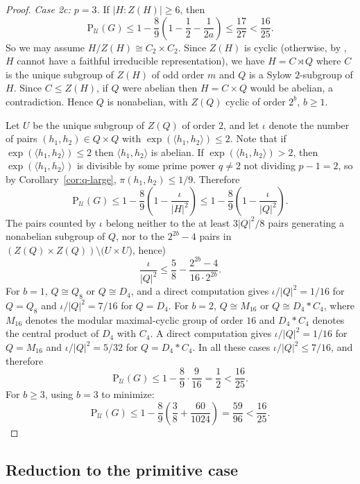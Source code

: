 \documentclass{amsart}
\newcommand{\Psu}{\mathrm{P}_{\mathcal{U}}}
\begin{document}
\begin{proof}
		\medskip
\noindent\textit{Case 2c: $p = 3$.}
If $|H:Z(H)| \geq 6$, then
$$\Psu(G) \leq 1-\frac{8}{9}\left(1-\frac{1}{2}
-\frac{1}{2a}\right) \leq \frac{17}{27} < \frac{16}{25}.$$
So we may assume $H/Z(H) \cong C_2 \times C_2$. Since $Z(H)$ 
is cyclic (otherwise, by \cite[Proposition 16.8]{dh}, $H$ cannot 
have a faithful irreducible representation), we have 
$H = C \rtimes Q$ where $C$ is the unique subgroup of $Z(H)$ 
of odd order $m$ and $Q$ is a Sylow $2$-subgroup of $H$. 
Since $C \leq Z(H)$, if $Q$ were abelian then $H = C \times Q$ 
would be abelian, a contradiction. Hence $Q$ is nonabelian, 
with $Z(Q)$ cyclic of order $2^b$, $b \geq 1$.



Let $U$ be the unique subgroup of $Z(Q)$ of order $2$, and let $\iota$ denote the number of pairs 
$(h_1,h_2) \in Q \times Q$ with $\exp(\langle h_1,h_2\rangle) 
\leq 2$. Note that if $\exp(\langle h_1,h_2\rangle) \leq 2$ 
then $\langle h_1,h_2\rangle$ is abelian. If 
$\exp(\langle h_1,h_2\rangle) > 2$, then $\exp(\langle h_1,h_2\rangle)$ 
is divisible by some prime power $q \neq 2$ not dividing 
$p-1=2$, so by Corollary~\ref{cor:q-large}, 
$\pi(h_1,h_2)\leq 1/9$. Therefore
$$\Psu(G) \leq 1 - \frac{8}{9}\left(1 - \frac{\iota}{|H|^2}\right)
\leq 1 - \frac{8}{9}\left(1 - \frac{\iota}{|Q|^2}\right).$$
The pairs counted by $\iota$ belong neither to the at least 
$3|Q|^2/8$ pairs generating a nonabelian subgroup of $Q$, nor to 
the $2^{2b}-4$ pairs in $(Z(Q) \times Z(Q)) \setminus (U \times U$), 
hence)
$$\frac{\iota}{|Q|^2} \leq \frac{5}{8} - 
\frac{2^{2b}-4}{16\cdot 2^{2b}}.$$
For $b = 1$, $Q \cong Q_8$ or $Q \cong D_4$, and a direct 
computation gives $\iota/|Q|^2 = 1/16$ for $Q = Q_8$ 
and $\iota/|Q|^2 = 7/16$ for $Q = D_4$.
For $b = 2$, $Q \cong M_{16}$ or $Q \cong D_4 \ast C_4$, 
where $M_{16}$ denotes the modular maximal-cyclic group of 
order $16$ and $D_4 \ast C_4$ denotes the central product 
of $D_4$ with $C_4$. A direct computation gives 
$\iota/|Q|^2 = 1/16$ for $Q = M_{16}$ and 
$\iota/|Q|^2 = 5/32$ for $Q = D_4 \ast C_4$.
In all these cases $\iota/|Q|^2 \leq 7/16$, and therefore
$$\Psu(G) \leq 1 - \frac{8}{9}\cdot\frac{9}{16} = \frac{1}{2} 
< \frac{16}{25}.$$
For $b \geq 3$, using $b=3$ to minimize:
$$\Psu(G) \leq 1 - \frac{8}{9}\left(\frac{3}{8} + 
\frac{60}{1024}\right) = \frac{59}{96} < \frac{16}{25}.$$
	\end{proof}

		
	
	
	\subsection{Reduction to the primitive case}
	
\end{document}
